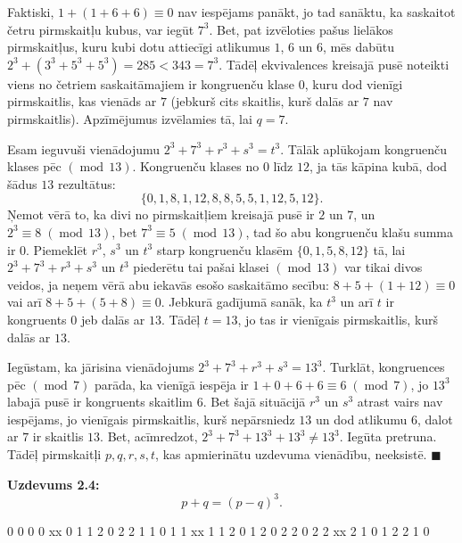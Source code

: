 \documentclass[a4paper,12pt]{article}
\begin{document}
Faktiski, $1 + (1 + 6 + 6) \equiv 0$ nav iespējams panākt, jo tad sanāktu, ka saskaitot četru
pirmskaitļu kubus, var iegūt $7^3$. Bet, pat izvēloties pašus lielākos pirmskaitļus, kuru
kubi dotu attiecīgi atlikumus $1$, $6$ un $6$, mēs dabūtu
$2^3 + (3^3 + 5^3 + 5^3) = 285 < 343 = 7^3$. Tādēļ ekvivalences kreisajā pusē noteikti
viens no četriem saskaitāmajiem ir kongruenču klase $0$, kuru dod vienīgi pirmskaitlis, kas vienāds ar $7$ (jebkurš
cits skaitlis, kurš dalās ar $7$ nav pirmskaitlis). Apzīmējumus izvēlamies tā, lai $q = 7$.

Esam ieguvuši vienādojumu $2^3 + 7^3 + r^3 + s^3 = t^3$. Tālāk aplūkojam kongruenču
klases pēc $(\operatorname{mod}\,13)$. Kongruenču klases no $0$ līdz $12$,
ja tās kāpina kubā, dod šādus $13$ rezultātus:
\[ \{ 0, 1, 8, 1, 12, 8, 8, 5, 5, 1, 12, 5, 12 \}. \]
Ņemot vērā to, ka divi no pirmskaitļiem kreisajā pusē ir $2$ un $7$, un
$2^3 \equiv 8\;(\operatorname{mod}\,13)$, bet $7^3 \equiv 5\;(\operatorname{mod}\,13)$,
tad šo abu kongruenču klašu summa ir $0$. Piemeklēt $r^3$, $s^3$ un $t^3$ starp
kongruenču klasēm $\{ 0, 1, 5, 8, 12 \}$ tā, lai $2^3 + 7^3 + r^3 + s^3$ un $t^3$
piederētu tai pašai klasei $(\operatorname{mod}\,13)$ var tikai divos veidos, ja neņem
vērā abu iekavās esošo saskaitāmo secību:
$8+5 + (1 + 12) \equiv 0$ vai arī $8 + 5 + (5 + 8) \equiv 0$. Jebkurā gadījumā sanāk, ka $t^3$ un arī $t$
ir kongruents $0$ jeb dalās ar $13$. Tādēļ $t = 13$, jo tas ir
vienīgais pirmskaitlis, kurš dalās ar $13$.

Iegūstam, ka jārisina vienādojums $2^3 + 7^3 + r^3 + s^3 = 13^3$. Turklāt, kongruences pēc
$(\operatorname{mod}\,7)$ parāda, ka vienīgā iespēja ir
$1 + 0 + 6 + 6 \equiv 6\;(\operatorname{mod}\,7)$, jo $13^3$ labajā pusē ir kongruents
skaitlim $6$. Bet šajā situācijā $r^3$ un $s^3$ atrast vairs nav iespējams,
jo vienīgais pirmskaitlis, kurš nepārsniedz $13$ un dod atlikumu $6$, dalot ar $7$ ir skaitlis $13$.
Bet, acīmredzot, $2^3 + 7^3 + 13^3 + 13^3 \neq 13^3$. Iegūta pretruna. Tādēļ pirmskaitļi
$p,q,r,s,t$, kas apmierinātu uzdevuma vienādību, neeksistē. $\blacksquare$




\vspace{20pt}
{\bf Uzdevums 2.4:} 
$$p + q = (p - q)^3.$$

0 0  0  0     xx
0 1  1  2
0 2  2  1
1 0  1  1     xx
1 1  2  0
1 2  0  2
2 0  2  2     xx
2 1  0  1
2 2  1  0 
\end{document}
